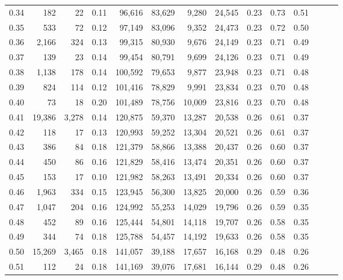 \begin{tabular}{rrrrrrrrrrrrrr}
0.34 &     182 &     22 &  0.11 &   96,616 &   83,629 &   9,280 &  24,545 &  0.23 &  0.73 &      0.51 \\
0.35 &     533 &     72 &  0.12 &   97,149 &   83,096 &   9,352 &  24,473 &  0.23 &  0.72 &      0.50 \\
0.36 &   2,166 &    324 &  0.13 &   99,315 &   80,930 &   9,676 &  24,149 &  0.23 &  0.71 &      0.49 \\
0.37 &     139 &     23 &  0.14 &   99,454 &   80,791 &   9,699 &  24,126 &  0.23 &  0.71 &      0.49 \\
0.38 &   1,138 &    178 &  0.14 &  100,592 &   79,653 &   9,877 &  23,948 &  0.23 &  0.71 &      0.48 \\
0.39 &     824 &    114 &  0.12 &  101,416 &   78,829 &   9,991 &  23,834 &  0.23 &  0.70 &      0.48 \\
0.40 &      73 &     18 &  0.20 &  101,489 &   78,756 &  10,009 &  23,816 &  0.23 &  0.70 &      0.48 \\
0.41 &  19,386 &  3,278 &  0.14 &  120,875 &   59,370 &  13,287 &  20,538 &  0.26 &  0.61 &      0.37 \\
0.42 &     118 &     17 &  0.13 &  120,993 &   59,252 &  13,304 &  20,521 &  0.26 &  0.61 &      0.37 \\
0.43 &     386 &     84 &  0.18 &  121,379 &   58,866 &  13,388 &  20,437 &  0.26 &  0.60 &      0.37 \\
0.44 &     450 &     86 &  0.16 &  121,829 &   58,416 &  13,474 &  20,351 &  0.26 &  0.60 &      0.37 \\
0.45 &     153 &     17 &  0.10 &  121,982 &   58,263 &  13,491 &  20,334 &  0.26 &  0.60 &      0.37 \\
0.46 &   1,963 &    334 &  0.15 &  123,945 &   56,300 &  13,825 &  20,000 &  0.26 &  0.59 &      0.36 \\
0.47 &   1,047 &    204 &  0.16 &  124,992 &   55,253 &  14,029 &  19,796 &  0.26 &  0.59 &      0.35 \\
0.48 &     452 &     89 &  0.16 &  125,444 &   54,801 &  14,118 &  19,707 &  0.26 &  0.58 &      0.35 \\
0.49 &     344 &     74 &  0.18 &  125,788 &   54,457 &  14,192 &  19,633 &  0.26 &  0.58 &      0.35 \\
0.50 &  15,269 &  3,465 &  0.18 &  141,057 &   39,188 &  17,657 &  16,168 &  0.29 &  0.48 &      0.26 \\
0.51 &     112 &     24 &  0.18 &  141,169 &   39,076 &  17,681 &  16,144 &  0.29 &  0.48 &      0.26 \\

\end{tabular}
